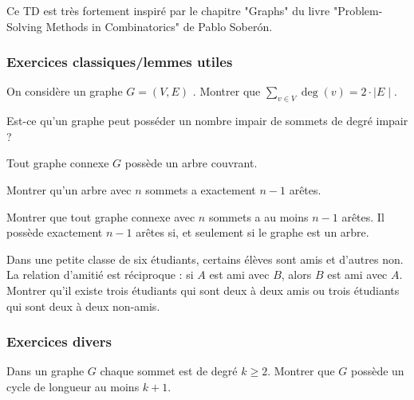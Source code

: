 ﻿Ce TD est très fortement inspiré par le chapitre "Graphs" du livre "Problem-Solving Methods in Combinatorics" de Pablo Soberón.

\subsubsection{Exercices classiques/lemmes utiles}

\begin{exo}

On considère un graphe $G=(V,E)$ . Montrer que $\sum_{v \in V} \deg(v) = 2 \cdot \mid E \mid$.

\end{exo}


\begin{exo}

Est-ce qu’un graphe peut posséder un nombre impair de sommets de degré impair ?

\end{exo}



\begin{exo}

Tout graphe connexe $G$ possède un arbre couvrant.

\end{exo}



\begin{exo}

Montrer qu’un arbre avec $n$ sommets a exactement $n-1$ arêtes.

\end{exo}
 
\begin{exo}

Montrer que tout graphe connexe avec $n$ sommets a au moins 
$n-1$ arêtes. Il possède exactement $n-1$ arêtes si, et seulement si le graphe est un arbre. 

\end{exo}


\begin{exo}

Dans une petite classe de six étudiants, certains élèves sont amis et d'autres non. La relation d'amitié est réciproque : si $A$ est ami avec $B$, alors $B$ est ami avec $A$. Montrer qu'il existe trois étudiants qui sont deux à deux amis ou trois étudiants qui sont deux à deux non-amis. 

\end{exo}

\subsubsection{Exercices divers}
\begin{exo}

Dans un graphe $G$ chaque sommet est de degré $k\geq 2$. Montrer que $G$ possède un cycle de longueur au moins $k+1$.

\end{exo}

